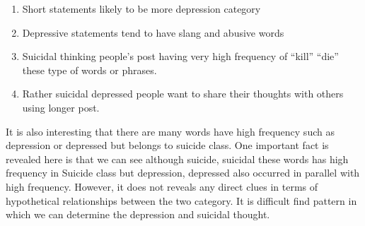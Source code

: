 \documentclass[sn-mathphys,Numbered]{sn-jnl}%
\theoremstyle{thmstyleone}%
\theoremstyle{thmstyletwo}%
\theoremstyle{thmstylethree}%
\begin{document}
\begin{enumerate}
\item Short statements likely to be more depression category
\item Depressive statements tend to have slang and abusive words
\item Suicidal thinking people’s post having very high frequency of “kill” “die” these type of words or phrases.
\item Rather suicidal depressed people want to share their thoughts with others using longer post.
\end{enumerate}
It is also interesting that there are many words have high frequency such as depression or depressed but belongs to suicide class. One important fact is revealed here is that we can see although suicide, suicidal these words has high frequency in Suicide class but depression, depressed also occurred in parallel with high frequency. However, it does not reveals any direct clues in terms of hypothetical relationships between the two category. It is difficult find pattern in which we can determine the depression and suicidal thought.  
\end{document}
